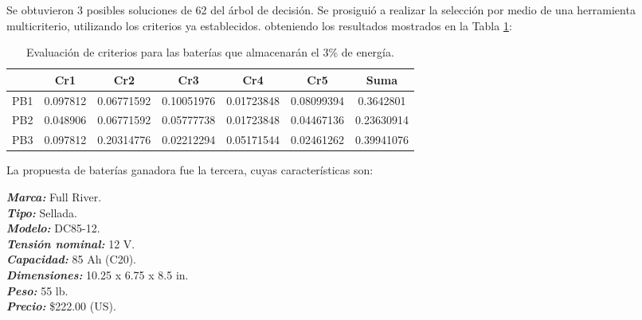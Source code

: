 Se obtuvieron 3 posibles soluciones de 62 del árbol de decisión. Se prosiguió a realizar la selección por medio de una herramienta multicriterio, utilizando los criterios ya establecidos. obteniendo los resultados mostrados en la Tabla \ref{tab:addlabel1}:
\begin{table}[H]
	\centering
	\caption{Evaluación de criterios para las baterías que almacenarán el 3\% de energía.}
	\begin{tabular}{|c|c|c|c|c|c|c|}
		\hline    
		\multicolumn{1}{|r|}{} & \cellcolor[rgb]{ .612,  .761,  .898}Cr1 & \cellcolor[rgb]{ .612,  .761,  .898}Cr2 & \cellcolor[rgb]{ .612,  .761,  .898}Cr3 & \cellcolor[rgb]{ .612,  .761,  .898}Cr4 & \cellcolor[rgb]{ .612,  .761,  .898}Cr5 & \cellcolor[rgb]{ .612,  .761,  .898}Suma \\
		\hline 
		\rowcolor[rgb]{ .659,  .816,  .553} PB1   & \cellcolor[rgb]{ 1,  1,  1}0.097812 & \cellcolor[rgb]{ 1,  1,  1}0.06771592 & \cellcolor[rgb]{ 1,  1,  1}0.10051976 & \cellcolor[rgb]{ 1,  1,  1}0.01723848 & \cellcolor[rgb]{ 1,  1,  1}0.08099394 & \cellcolor[rgb]{ 1,  1,  1}0.3642801 \\
		\hline
		\rowcolor[rgb]{ .659,  .816,  .553} PB2   & \cellcolor[rgb]{ 1,  1,  1}0.048906 & \cellcolor[rgb]{ 1,  1,  1}0.06771592 & \cellcolor[rgb]{ 1,  1,  1}0.05777738 & \cellcolor[rgb]{ 1,  1,  1}0.01723848 & \cellcolor[rgb]{ 1,  1,  1}0.04467136 & \cellcolor[rgb]{ 1,  1,  1}0.23630914 \\
		\hline
		\rowcolor[rgb]{ .659,  .816,  .553} PB3   & \cellcolor[rgb]{ 1,  .753,  0}0.097812 & \cellcolor[rgb]{ 1,  .753,  0}0.20314776 & \cellcolor[rgb]{ 1,  .753,  0}0.02212294 & \cellcolor[rgb]{ 1,  .753,  0}0.05171544 & \cellcolor[rgb]{ 1,  .753,  0}0.02461262 & \cellcolor[rgb]{ 1,  .753,  0}0.39941076 \\
		\hline
	\end{tabular}%
	\label{tab:addlabel1}%
\end{table}%

La propuesta de baterías ganadora fue la tercera, cuyas características son:

\hspace*{1em}\textbf{\textit{Marca:}} Full River.\\
\hspace*{2.5em}\textbf{\textit{Tipo:}} Sellada.\\
\hspace*{2.5em}\textbf{\textit{Modelo:}} DC85-12.\\
\hspace*{2.5em}\textbf{\textit{Tensión nominal:}} 12 V.\\ 
\hspace*{2.5em}\textbf{\textit{Capacidad:}} 85 Ah (C20).\\
\hspace*{2.5em}\textbf{\textit{Dimensiones:}} 10.25 x 6.75 x 8.5 in.\\
\hspace*{2.5em}\textbf{\textit{Peso:}} 55 lb.\\
\hspace*{2.5em}\textbf{\textit{Precio:}} \$222.00 (US).\\

